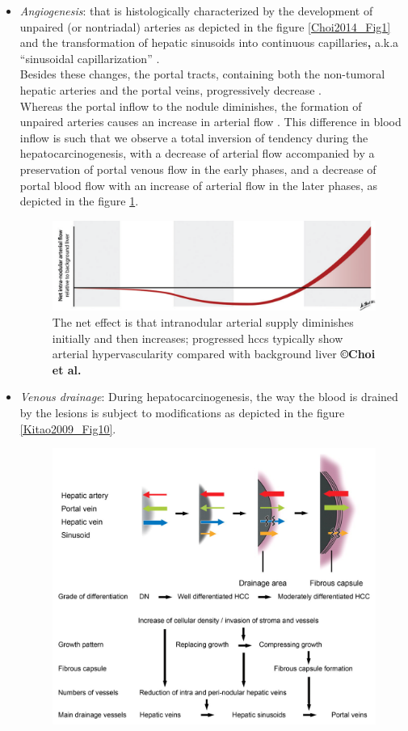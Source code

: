 \begin{itemize}
\item \emph{Angiogenesis}: that is histologically characterized by the
  development of unpaired (or nontriadal) arteries as depicted in the
  figure  \ref{Choi2014_Fig1} and the transformation of
  hepatic sinusoids into continuous capillaries\textbf{,} a.k.a
  ``sinusoidal capillarization'' \cite{Palmer2012,Coleman2005}.\\
  Besides these changes, the portal tracts, containing both the
  non-tumoral hepatic arteries and the portal veins, progressively
  decrease \cite{Kojiro2005}.\\
  Whereas the portal inflow to the nodule diminishes, the formation of
  unpaired arteries causes an increase in arterial flow \cite{Palmer2012, Coleman2005}. This difference in blood inflow is such that
  we observe a total inversion of tendency during the
  hepatocarcinogenesis, with a decrease of arterial flow accompanied by
  a preservation of portal venous flow in the early phases, and a
  decrease of portal blood flow with an increase of arterial flow in the
  later phases, as depicted in the figure \ref{Choi2014_Fig1_bottom}.
\begin{figure}[th!]
\centering
\includegraphics[width=0.7\linewidth]{images/image5}
\caption{The net effect is that intranodular arterial supply diminishes initially and then increases; progressed \ac{hcc}s typically show arterial hypervascularity compared with background liver \textbf{©Choi et al. \cite{Choi2014}}}
\label{Choi2014_Fig1_bottom}
\end{figure}
\item
  \emph{Venous drainage}: During hepatocarcinogenesis, the way the blood
  is drained by the lesions is subject to modifications as depicted in
  the figure \ref{Kitao2009_Fig10}.
\begin{figure}[th!]
\centering
\includegraphics[width=0.7\linewidth]{images/kitao}

\end{figure}
\end{itemize}
